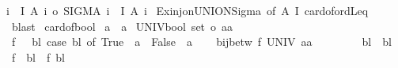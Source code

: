 \begin{isabellebody}
{\isachardoublequoteopen}{\isacharbar}{\kern0pt}{\isasymUnion}i\ {\isasymin}\ I{\isachardot}{\kern0pt}\ A\ i{\isacharbar}{\kern0pt}\ {\isasymle}o\ {\isacharbar}{\kern0pt}SIGMA\ i\ {\isacharcolon}{\kern0pt}\ I{\isachardot}{\kern0pt}\ A\ i{\isacharbar}{\kern0pt}{\isachardoublequoteclose}\isanewline
%
\isadelimproof
%
\endisadelimproof
%
\isatagproof
{}\isamarkupfalse%
\ Ex{\isacharunderscore}{\kern0pt}inj{\isacharunderscore}{\kern0pt}on{\isacharunderscore}{\kern0pt}UNION{\isacharunderscore}{\kern0pt}Sigma\ {\isacharbrackleft}{\kern0pt}of\ A\ I{\isacharbrackright}{\kern0pt}\ card{\isacharunderscore}{\kern0pt}of{\isacharunderscore}{\kern0pt}ordLeq\ \isamarkupfalse%
\ blast%
\endisatagproof
{\isafoldproof}%
%
\isadelimproof
\isanewline
%
\endisadelimproof
\isanewline
{}\isamarkupfalse%
\ card{\isacharunderscore}{\kern0pt}of{\isacharunderscore}{\kern0pt}bool{\isacharcolon}{\kern0pt}\isanewline
{}\ {\isachardoublequoteopen}a{}\ {\isasymnoteq}\ a{}{\isachardoublequoteclose}\isanewline
{}\ {\isachardoublequoteopen}{\isacharbar}{\kern0pt}UNIV{\isacharcolon}{\kern0pt}{\isacharcolon}{\kern0pt}bool\ set{\isacharbar}{\kern0pt}\ {\isacharequal}{\kern0pt}o\ {\isacharbar}{\kern0pt}{\isacharbraceleft}{\kern0pt}a{}{\isacharcomma}{\kern0pt}a{}{\isacharbraceright}{\kern0pt}{\isacharbar}{\kern0pt}{\isachardoublequoteclose}\isanewline
%
\isadelimproof
%
\endisadelimproof
%
\isatagproof
{}\isamarkupfalse%
{\isacharminus}{\kern0pt}\isanewline
\ \ \isamarkupfalse%
\ {\isacharquery}{\kern0pt}f\ {\isacharequal}{\kern0pt}\ {\isachardoublequoteopen}{\isasymlambda}\ bl{\isachardot}{\kern0pt}\ case\ bl\ of\ True\ {\isasymRightarrow}\ a{}\ {\isacharbar}{\kern0pt}\ False\ {\isasymRightarrow}\ a{}{\isachardoublequoteclose}\isanewline
\ \ \isamarkupfalse%
\ {\isachardoublequoteopen}bij{\isacharunderscore}{\kern0pt}betw\ {\isacharquery}{\kern0pt}f\ UNIV\ {\isacharbraceleft}{\kern0pt}a{}{\isacharcomma}{\kern0pt}a{}{\isacharbraceright}{\kern0pt}{\isachardoublequoteclose}\isanewline
\ \ \isamarkupfalse%
{\isacharminus}{\kern0pt}\isanewline
\ \ \ \ \isacommand{{\isacharbraceleft}{\kern0pt}}\isamarkupfalse%
\isamarkupfalse%
\ bl{}\ \ bl{}\ \isamarkupfalse%
\ {\isachardoublequoteopen}{\isacharquery}{\kern0pt}f\ \ bl{}\ {\isacharequal}{\kern0pt}\ {\isacharquery}{\kern0pt}f\ bl{}{\isachardoublequoteclose}\isanewline

\end{isabellebody}
